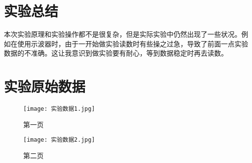 \documentclass[11pt]{article}
\begin{document}
\section{实验总结}

本次实验原理和实验操作都不是很复杂，但是实际实验中仍然出现了一些状况。例如在使用示波器时，由于一开始做实验读数时有些操之过急，导致了前面一点实验数据的不准确。这让我意识到做实验要有耐心，等到数据稳定时再去读数。

\section{实验原始数据}

\newpage

\begin{figure}[htbp]
    \centering
    \texttt{[image: 实验数据1.jpg]}
\caption{第一页}
\end{figure}

\begin{figure}[htbp]
    \centering
    \texttt{[image: 实验数据2.jpg]}
\caption{第二页}
\end{figure}
\end{document}
